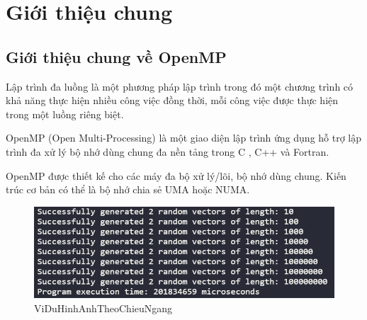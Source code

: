 \newpage
\section{Giới thiệu chung}
\subsection{Giới thiệu chung về OpenMP}
Lập trình đa luồng là một phương pháp lập trình trong đó một chương trình có khả năng thực hiện nhiều công việc đồng thời, mỗi công việc được thực hiện trong một luồng riêng biệt.

OpenMP (Open Multi-Processing) là một giao diện lập trình ứng dụng   hỗ trợ lập trình đa xử lý bộ nhớ dùng chung đa nền tảng trong C , C++ và Fortran.

OpenMP được thiết kế cho các máy đa bộ xử lý/lõi, bộ nhớ dùng chung. Kiến trúc cơ bản có thể là bộ nhớ chia sẻ UMA hoặc NUMA.

\begin{figure}[h] %
    \centering
    \includegraphics[width=1\textwidth]{pictures/image.png} %
    \caption{ViDuHinhAnhTheoChieuNgang} %
    \label{pictures:nghia12} %
    \end{figure} 


 




 
 
 

